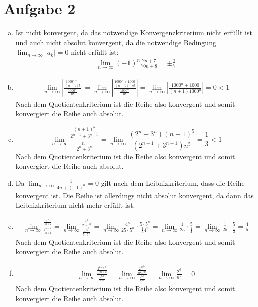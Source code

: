 \documentclass[10pt,a4paper,parskip=half]{scrartcl}
\begin{document}
\section*{Aufgabe 2}
\begin{enumerate}[a)]
	\item 
	Ist nicht konvergent, da das notwendige Konvergenzkriterium nicht erfüllt ist und auch nicht absolut konvergent, da die notwendige Bedingung $\lim_{n\to\infty} |a_k| = 0$ nicht erfüllt ist:
		\begin{align*} 
			\lim_{n \to \infty} (-1)^n\frac{2n+7}{70n + 8} = \pm \frac 27 
		\end{align*}
         \item 
            \begin{align*} 
               \lim_{n \to \infty} \left|\frac{\frac{1000^{n+1}}{(n+1)!}}{\frac{1000^n}{n!}}\right| = \lim_{n \to \infty} \left|\frac{\frac{1000^{n} + 1000}{(n+1) \cdot n!}}{\frac{1000^n}{n!}}\right| = \lim_{n \to \infty} \left|\frac{1000^{n} + 1000}{(n+1) 1000^n}\right| = 0 < 1
            \end{align*}
            Nach dem Quotientenkriterium ist die Reihe also konvergent und somit konvergiert die Reihe auch absolut.
         \item 
         \[ \lim_{n \to \infty} \frac{\frac{(n+1)^5}{2^{n+1}+3^{n+1}}}{\frac{n^5}{2^{n}+3^{n}}} =\lim_{n \to \infty} \frac{(2^n + 3^n)(n+1)^5}{(2^{n+1} + 3^{n+1})n^5} = \frac13 < 1  \]
         Nach dem Quotientenkriterium ist die Reihe also konvergent und somit konvergiert die Reihe auch absolut.
         \item 
         Da $\lim_{n \to \infty} \frac{1}{4n + (-1)^n} = 0$ gilt nach dem Leibnizkriterium, dass die Reihe konvergent ist. Die Reihe ist allerdings nicht absolut konvergent, da dann das Leibnizkriterium nicht mehr erfüllt ist.
\item
\begin{align*}
\lim_{n\to\infty} \frac{\frac{4^{n}}{5^{n+2}}}{\frac{4^{n-1}}{5^{n+1}}} = \lim_{n\to\infty} \frac{\frac{4^{n}}{25\cdot5^{n}}}{\frac{\frac 1 4 4^{n}}{5\cdot5^{n}}} = \lim_{n\to\infty}\frac{4^{n}}{25\cdot5^{n}} \cdot \frac{5\cdot5^{n}}{\frac 1 4 4^{n}} = \lim_{n\to\infty}\frac{1}{25} \cdot \frac{5}{\frac 1 4} = \lim_{n\to\infty}\frac{1}{25} \cdot \frac{5}{\frac 1 4} = \frac 4 5
\end{align*}
Nach dem Quotientenkriterium ist die Reihe also konvergent und somit konvergiert die Reihe auch absolut.
\item
\begin{align*}
\lim_{n\to\infty} \frac{\frac{2^{6n+6}}{n^{2n+2}}}{\frac{2^{6n}}{n^{2n}}} = \lim_{n\to\infty} \frac{\frac{2^62^{6n}}{n^2n^{2n}}}{\frac{2^{6n}}{n^{2n}}} = \lim_{n\to\infty} \frac{2^6}{n^2} = 0 
\end{align*}
Nach dem Quotientenkriterium ist die Reihe also konvergent und somit konvergiert die Reihe auch absolut.
\end{enumerate}
\end{document}
